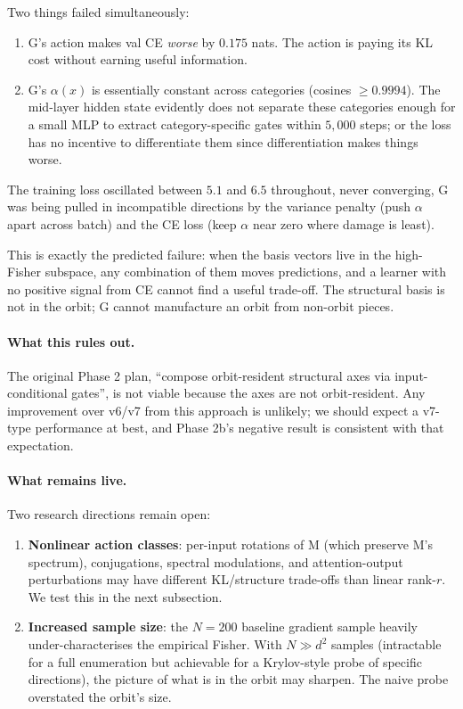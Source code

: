 \documentclass[11pt, a4paper]{article}
\theoremstyle{plain}
\theoremstyle{definition}
\theoremstyle{remark}
\begin{document}
Two things failed simultaneously:
\begin{enumerate}[nosep]
\item G's action makes val CE \emph{worse} by $0.175$ nats. The action is paying its KL cost without earning useful information.
\item G's $\alpha(x)$ is essentially constant across categories (cosines $\geq 0.9994$). The mid-layer hidden state evidently does not separate these categories enough for a small MLP to extract category-specific gates within $5{,}000$ steps; or the loss has no incentive to differentiate them since differentiation makes things worse.
\end{enumerate}
The training loss oscillated between $5.1$ and $6.5$ throughout, never converging, G was being pulled in incompatible directions by the variance penalty (push $\alpha$ apart across batch) and the CE loss (keep $\alpha$ near zero where damage is least).

This is exactly the predicted failure: when the basis vectors live in the high-Fisher subspace, any combination of them moves predictions, and a learner with no positive signal from CE cannot find a useful trade-off.
The structural basis is not in the orbit; G cannot manufacture an orbit from non-orbit pieces.

\paragraph{What this rules out.}
The original Phase 2 plan, ``compose orbit-resident structural axes via input-conditional gates'', is not viable because the axes are not orbit-resident.
Any improvement over v6/v7 from this approach is unlikely; we should expect a v7-type performance at best, and Phase 2b's negative result is consistent with that expectation.

\paragraph{What remains live.}
Two research directions remain open:
\begin{enumerate}[nosep]
\item \textbf{Nonlinear action classes}: per-input rotations of M (which preserve M's spectrum), conjugations, spectral modulations, and attention-output perturbations may have different KL/structure trade-offs than linear rank-$r$. We test this in the next subsection.
\item \textbf{Increased sample size}: the $N = 200$ baseline gradient sample heavily under-characterises the empirical Fisher. With $N \gg d^2$ samples (intractable for a full enumeration but achievable for a Krylov-style probe of specific directions), the picture of what is in the orbit may sharpen. The naive probe overstated the orbit's size.
\end{enumerate}
\end{document}
